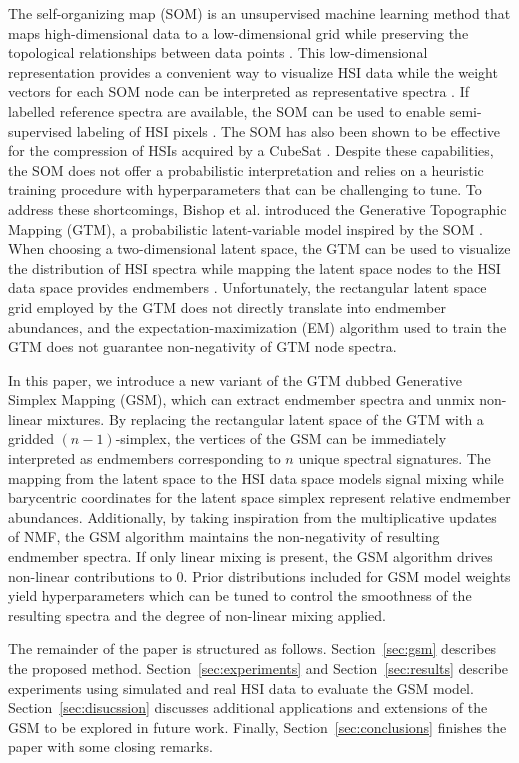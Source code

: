 \documentclass[remotesensing,article,submit,pdftex,moreauthors]{Definitions/mdpi}
\begin{document}
The self-organizing map (SOM) is an unsupervised machine learning method that maps high-dimensional data to a low-dimensional grid while preserving the topological relationships between data points \cite{kohonen-som-1}. This low-dimensional representation provides a convenient way to visualize HSI data while the weight vectors for each SOM node can be interpreted as representative spectra \cite{cantero2004analysis, duran2007time,som-hsi}. If labelled reference spectra are available, the SOM can be used to enable semi-supervised labeling of HSI pixels \cite{riese2019supervised}. The SOM has also been shown to be effective for the compression of HSIs acquired by a CubeSat \cite{som-satellite}. Despite these capabilities, the SOM does not offer a probabilistic interpretation and relies on a heuristic training procedure with hyperparameters that can be challenging to tune. To address these shortcomings, Bishop et al. introduced the Generative Topographic Mapping (GTM), a probabilistic latent-variable model inspired by the SOM \cite{gtm-orig}. When choosing a two-dimensional latent space, the GTM can be used to visualize the distribution of HSI spectra while mapping the latent space nodes to the HSI data space provides endmembers \cite{robot-team-gtm}. Unfortunately, the rectangular latent space grid employed by the GTM does not directly translate into endmember abundances, and the expectation-maximization (EM) algorithm used to train the GTM does not guarantee non-negativity of GTM node spectra. 

In this paper, we introduce a new variant of the GTM dubbed Generative Simplex Mapping (GSM), which can extract endmember spectra and unmix non-linear mixtures. By replacing the rectangular latent space of the GTM with a gridded $(n-1)$-simplex, the vertices of the GSM can be immediately interpreted as endmembers corresponding to $n$ unique spectral signatures. The mapping from the latent space to the HSI data space models signal mixing while barycentric coordinates for the latent space simplex represent relative endmember abundances. Additionally, by taking inspiration from the multiplicative updates of NMF, the GSM algorithm maintains the non-negativity of resulting endmember spectra. If only linear mixing is present, the GSM algorithm drives non-linear contributions to $0$. Prior distributions included for GSM model weights yield hyperparameters which can be tuned to control the smoothness of the resulting spectra and the degree of non-linear mixing applied.

The remainder of the paper is structured as follows. Section~\ref{sec:gsm} describes the proposed method. Section~\ref{sec:experiments} and Section~\ref{sec:results} describe experiments using simulated and real HSI data to evaluate the GSM model. Section~\ref{sec:disucssion} discusses additional applications and extensions of the GSM to be explored in future work. Finally, Section~\ref{sec:conclusions} finishes the paper with some closing remarks.
\end{document}
